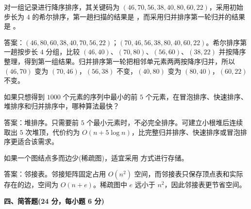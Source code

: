 \begin{question}
对一组记录进行降序排序，其关键码为 $(46,70,56,38,40,80,60,22)$，采用初始步长为 $4$ 的希尔排序，第一趟扫描的结果是 \blank，而采用归并排序第一轮归并的结果是 \blank。
\begin{solution}
答案：$(46,80,60,38,40,70,56,22)$；$(70,46,56,38,80,40,60,22)$。希尔排序第一趟按步长 $4$ 分组，比较 $(46,40)$、$(70,80)$、$(56,60)$、$(38,22)$ 并按降序整理，得到第一组结果。归并排序第一轮把相邻单元素两两按降序归并，所以 $(46,70)$ 变为 $(70,46)$，$(56,38)$ 不变，$(40,80)$ 变为 $(80,40)$，$(60,22)$ 不变。
\end{solution}
\end{question}

\begin{question}
如果只想得到 $1000$ 个元素的序列中最小的前 $5$ 个元素，在冒泡排序、快速排序、堆排序和归并排序中，哪种算法最快？\blank
\begin{solution}
答案：堆排序。只需要前 $5$ 个最小元素时，不必完全排序。可建立小根堆后连续取出 $5$ 次堆顶，代价约为 $O(n+5\log n)$，比完整归并排序、快速排序或冒泡排序更适合该需求。
\end{solution}
\end{question}

\begin{question}
如果一个图结点多而边少(稀疏图)，适宜采用 \blank 方式进行存储。
\begin{solution}
答案：邻接表。邻接矩阵固定占用 $O(n^2)$ 空间，而邻接表只保存顶点表和实际存在的边，空间为 $O(n+e)$。稀疏图中 $e$ 远小于 $n^2$，因此邻接表更节省空间。
\end{solution}
\end{question}

\textbf{四、简答题(24 分，每小题 6 分)}


